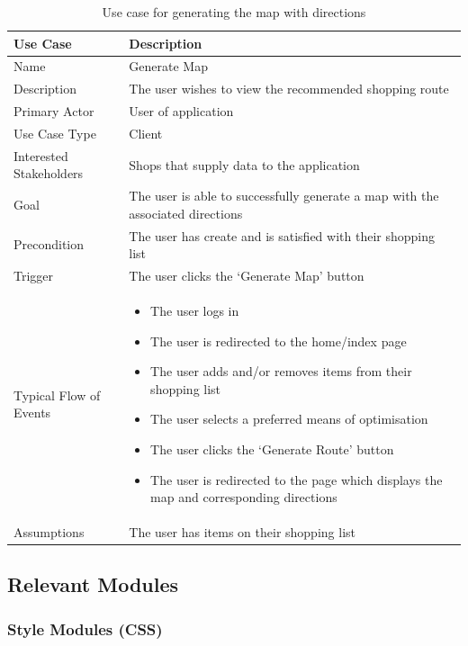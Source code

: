 \documentclass[10pt,twocolumn]{witseiepaper}
\begin{document}
		\begin{table}[htbp]
			\centering
			\caption{Use case for generating the map with directions}
			\label{uc:map}
			\begin{tabular}{|p{}|p{}|}
				\hline
				\textbf{Use Case} & \textbf{Description} \\ \hline
				Name & Generate Map \\ \hline
				Description & The user wishes to view the recommended shopping route \\ \hline
				Primary Actor & User of application \\ \hline
				Use Case Type & Client \\ \hline
				Interested Stakeholders & Shops that supply data to the application \\ \hline
				Goal & The user is able to successfully generate a map with the associated directions \\ \hline
				Precondition & The user has create and is satisfied with their shopping list \\ \hline
				Trigger & The user clicks the `Generate Map' button \\ \hline
				Typical Flow of Events & 
				\begin{itemize}
					\item The user logs in
					\item The user is redirected to the home/index page
					\item The user adds and/or removes items from their shopping list
					\item The user selects a preferred means of optimisation
					\item The user clicks the `Generate Route' button
					\item The user is redirected to the page which displays the map and corresponding directions
				\end{itemize}
				\\ \hline
				Assumptions & The user has items on their shopping list \\
				\hline
			\end{tabular}
		\end{table}
	\clearpage
	\subsection{Relevant Modules}
		
		\subsubsection{Style Modules (CSS)}
		
\end{document}
